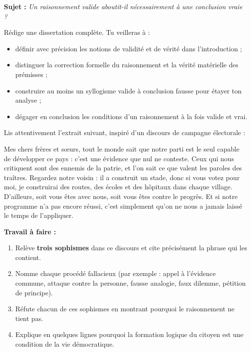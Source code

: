 \documentclass[11pt]{article}
\newcommand{\cle}[1]{{\popxbold\color{popdark}#1}}
\begin{document}
\begin{exercice}
\textbf{Sujet :} \emph{Un raisonnement valide aboutit-il nécessairement à une conclusion vraie ?}

Rédige une dissertation complète. Tu veilleras à :
\begin{itemize}
\item définir avec précision les notions de \cle{validité} et de \cle{vérité} dans l'introduction ;
\item distinguer la correction formelle du raisonnement et la vérité matérielle des prémisses ;
\item construire au moins un syllogisme valide à conclusion fausse pour étayer ton analyse ;
\item dégager en conclusion les conditions d'un raisonnement à la fois valide et vrai.
\end{itemize}
\end{exercice}

\begin{exercice}
Lis attentivement l'extrait suivant, inspiré d'un discours de campagne électorale :

\guillemotleft Mes chers frères et sœurs, tout le monde sait que notre parti est le seul capable de développer ce pays : c'est une évidence que nul ne conteste. Ceux qui nous critiquent sont des ennemis de la patrie, et l'on sait ce que valent les paroles des traîtres. Regardez notre voisin : il a construit un stade, donc si vous votez pour moi, je construirai des routes, des écoles et des hôpitaux dans chaque village. D'ailleurs, soit vous êtes avec nous, soit vous êtes contre le progrès. Et si notre programme n'a pas encore réussi, c'est simplement qu'on ne nous a jamais laissé le temps de l'appliquer. \guillemotright

\textbf{Travail à faire :}
\begin{enumerate}
\item Relève \textbf{trois sophismes} dans ce discours et cite précisément la phrase qui les contient.
\item Nomme chaque procédé fallacieux (par exemple : appel à l'évidence commune, attaque contre la personne, fausse analogie, faux dilemme, pétition de principe).
\item Réfute chacun de ces sophismes en montrant pourquoi le raisonnement ne tient pas.
\item Explique en quelques lignes pourquoi la formation logique du citoyen est une condition de la vie démocratique.
\end{enumerate}
\end{exercice}
\end{document}
